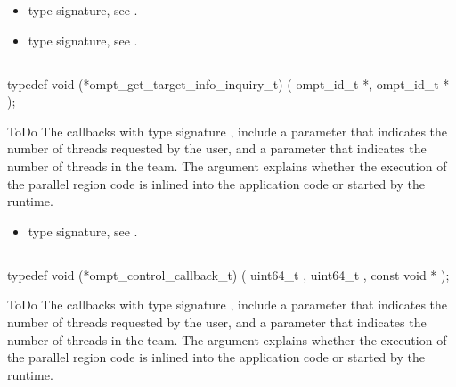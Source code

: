 \begin{targetRecord}
\crossreferences
\begin{itemize}
\item {} type signature, see
.
\item {} type signature, see
.
\end{itemize}



\subsection{}
\label{subsec:ompt_get_target_info_inquiry_t}
\format
\begin{boxedcode}
typedef void (*ompt\_get\_target\_info\_inquiry\_t) (
  ompt\_id\_t *,
  ompt\_id\_t *
);
\end{boxedcode}
\descr ToDo
The callbacks with type signature ,
include a parameter 
that indicates the number of threads requested by the user, and a parameter
 that indicates the number of threads in the team.
The  argument explains whether the execution of the parallel
region code is inlined into the application code or started by the runtime.

\crossreferences
\begin{itemize}
\item {} type signature, see
.
\end{itemize}
\end{targetRecord}


\subsection{}
\label{subsec:ompt_control_callback_t}
\format
\begin{boxedcode}
typedef void (*ompt\_control\_callback\_t) (
  uint64\_t ,
  uint64\_t ,
  const void *
);
\end{boxedcode}
\descr ToDo
The callbacks with type signature ,
include a parameter 
that indicates the number of threads requested by the user, and a parameter
 that indicates the number of threads in the team.
The  argument explains whether the execution of the parallel
region code is inlined into the application code or started by the runtime.











